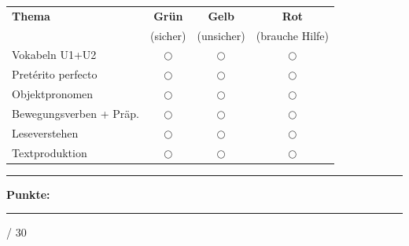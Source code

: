 \documentclass[10pt, a4paper]{article}
\newcommand{\sanstext}[1]{{\fontfamily{phv}\selectfont #1}}
\newcommand{\maxpunkte}{30}
\newcommand{\luecke}[1]{\rule{#1}{0.4pt}}
\begin{document}
\vspace{4pt}

{\footnotesize
\begin{tabular}{@{}lccc@{}}
\textbf{Thema} & \textcolor{green!70!black}{\textbf{Grün}} & \textcolor{yellow!80!black}{\textbf{Gelb}} & \textcolor{red!70!black}{\textbf{Rot}} \\
& {\scriptsize (sicher)} & {\scriptsize (unsicher)} & {\scriptsize (brauche Hilfe)} \\
\midrule
Vokabeln U1+U2 & $\bigcirc$ & $\bigcirc$ & $\bigcirc$ \\
Pretérito perfecto & $\bigcirc$ & $\bigcirc$ & $\bigcirc$ \\
Objektpronomen & $\bigcirc$ & $\bigcirc$ & $\bigcirc$ \\
Bewegungsverben + Präp. & $\bigcirc$ & $\bigcirc$ & $\bigcirc$ \\
Leseverstehen & $\bigcirc$ & $\bigcirc$ & $\bigcirc$ \\
Textproduktion & $\bigcirc$ & $\bigcirc$ & $\bigcirc$ \\
\end{tabular}
}


\vfill

\noindent\rule{\textwidth}{0.5pt}

\vspace{4pt}

\hfill\sanstext{\textbf{Punkte:}} \luecke{1.2cm} / \maxpunkte
\end{document}
